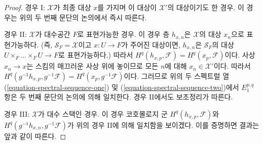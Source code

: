 \begin{proof}
\medskip\noindent
경우 I: $\mathcal{X}$가 최종 대상 $x$를 가지며 이 대상이
$\mathcal{X}'$의 대상이기도 한 경우. 이 경우는 위의 두 번째
문단의 논의에서 즉시 따른다.

\medskip\noindent
경우 II: $\mathcal{X}$가 대수공간 $F$로 표현가능한 경우.
이 경우 층 $h_{x, n}$은 $\mathcal{X}$의 대상 $x_n$으로
표현가능하다. (즉, $\mathcal{S}_F = \mathcal{X}$이고
$x : U \to F$가 주어진 대상이면, $h_{x, n}$은
$\mathcal{S}_F$의 대상 $U \times_F \ldots \times_F U \to F$로
표현가능하다.) 따라서 $H^q(h_{x, p}, \mathcal{F}) = H^q(x_p, \mathcal{F})$이다.
사상 $x_n \to x$는 스킴의 매끄러운 사상 위에 놓이므로 모든 $n$에 대해
$x_n \in \mathcal{X}'$이다. 따라서
$H^q(g^{-1}h_{x, p}, g^{-1}\mathcal{F}) = H^q(x_p, g^{-1}\mathcal{F})$이다.
그러므로 위의 두 스펙트럴 열
(\ref{equation-spectral-sequence-one}) 및
(\ref{equation-spectral-sequence-two})에서 $E_1^{p, q}$ 항은
두 번째 문단의 논의에 의해 일치한다. 경우 II에서도 보조정리가 따른다.

\medskip\noindent
경우 III: $\mathcal{X}$가 대수 스택인 경우. 이 경우 코호몰로지 군
$H^q(h_{x, p}, \mathcal{F})$와
$H^q(g^{-1}h_{x, n}, g^{-1}\mathcal{F})$가 위의 경우 II에 의해
일치함을 보이겠다. 이를 증명하면 결과는 앞과 같이 따른다.


\end{proof}
